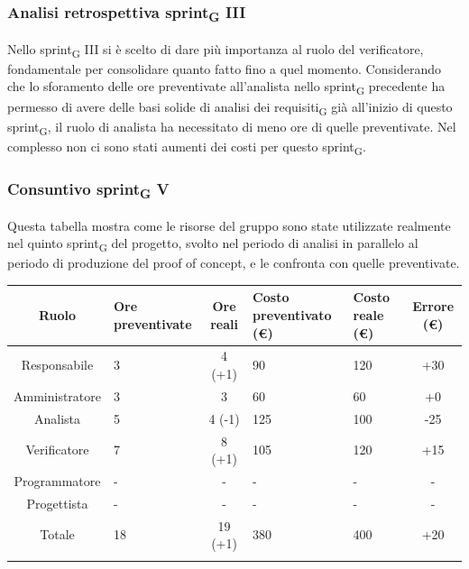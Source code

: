 \subsubsection{Analisi retrospettiva sprint\textsubscript{G} III}
Nello sprint\textsubscript{G} III si è scelto di dare più importanza al ruolo del verificatore, fondamentale per consolidare quanto fatto fino a quel momento. Considerando che lo sforamento delle ore preventivate all'analista nello sprint\textsubscript{G} precedente ha permesso di avere delle basi solide di analisi dei requisiti\textsubscript{G} già all'inizio di questo sprint\textsubscript{G}, il ruolo di analista ha necessitato di meno ore di quelle preventivate. Nel complesso non ci sono stati aumenti dei costi per questo sprint\textsubscript{G}.

\newpage
\subsubsection{Consuntivo sprint\textsubscript{G} V}
Questa tabella mostra come le risorse del gruppo sono state utilizzate realmente nel quinto sprint\textsubscript{G} del progetto, svolto nel periodo di analisi in parallelo al periodo di produzione del proof of concept, e le confronta con quelle preventivate.

\setlength\extrarowheight{5pt}
\begin{tabularx}{\textwidth}{|c|XcXX|c|}
	\hline
	\rowcolor{white}
	\textbf{Ruolo} & \textbf{Ore preventivate} & \textbf{Ore reali} & \textbf{Costo preventivato (€)} & \textbf{Costo reale (€)} & \textbf{Errore (€)} \\
	\hline
	Responsabile &3&4 (+1)&90&120&+30\\
	Amministratore &3& 3&60&60&+0\\
	Analista &5&4 (-1)&125&100&-25\\
	Verificatore &7&8 (+1)&105&120&+15\\
	Programmatore &-&-&-&-&-\\
	Progettista &-&-&-&-&- \\
	\hline
	Totale &18&19 (+1)&380&400&+20\\
	\hline
	\rowcolor{white}
	\caption{Consuntivo ore e costi per ruolo del quinto sprint\textsubscript{G}}
\end{tabularx}
